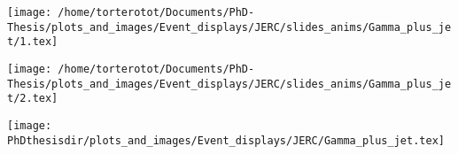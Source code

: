 \begin{frame}
\begin{center}
\texttt{[image: /home/torterotot/Documents/PhD-Thesis/plots\_and\_images/Event\_displays/JERC/slides\_anims/Gamma\_plus\_jet/1.tex]}
\end{center}
\end{frame}

\begin{frame}
\addtocounter{framenumber}{-1}
\transboxout
{}
\begin{center}
\texttt{[image: /home/torterotot/Documents/PhD-Thesis/plots\_and\_images/Event\_displays/JERC/slides\_anims/Gamma\_plus\_jet/2.tex]}
\end{center}
\end{frame}

\begin{frame}
\addtocounter{framenumber}{-1}
\transdissolve
\begin{center}
\texttt{[image: \\PhDthesisdir/plots\_and\_images/Event\_displays/JERC/Gamma\_plus\_jet.tex]}
\end{center}
\end{frame}